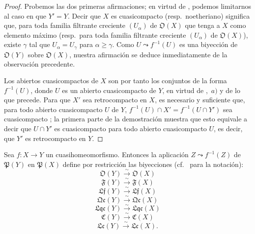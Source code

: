 \begin{proof}
Probemos las dos primeras afirmaciones; en virtud de , podemos limitarnos al caso en que $Y'=Y$.
Decir que $X$ es cuasicompacto (resp.\ noetheriano) significa que, para toda familia filtrante creciente $(U_\alpha)$ de $\mathfrak{O}(X)$ que tenga a $X$ como elemento máximo (resp.\ para toda familia filtrante creciente $(U_\alpha)$ de $\mathfrak{O}(X)$), existe $\gamma$ tal que $U_\alpha=U_\gamma$ para $\alpha\geq\gamma$.
Como $U\leadsto f^{-1}(U)$ es una biyección de $\mathfrak{O}(Y)$ sobre $\mathfrak{O}(X)$, nuestra afirmación se deduce inmediatamente de la observación precedente.

Los abiertos cuasicompactos de $X$ son por tanto los conjuntos de la forma $f^{-1}(U)$, donde $U$ es un abierto cuasicompacto de $Y$, en virtud de ,~$a)$ y de lo que precede.
Para que $X'$ sea retrocompacto en $X$, es necesario y suficiente que, para todo abierto cuasicompacto $U$ de $Y$, $f^{-1}(U)\cap X'=f^{-1}(U\cap Y')$ sea cuasicompacto ; la primera parte de la demostración muestra que esto equivale a decir que $U\cap Y'$ es cuasicompacto para todo abierto cuasicompacto $U$, es decir, que $Y'$ es retrocompacto en $Y$.
\end{proof}

\begin{proposition}[10.2.7]
\label{IV.10.2.7}
Sea $f:X\to Y$ un cuasihomeomorfismo.
Entonces la aplicación $Z\leadsto f^{-1}(Z)$ de $\mathfrak{P}(Y)$ en $\mathfrak{P}(X)$ define por restricción las biyecciones \textup{(cf.\  para la notación)}:
\[
  \mathfrak{O}(Y)\xrightarrow{\sim}\mathfrak{O}(X)
\]
\[
  \mathfrak{F}(Y)\xrightarrow{\sim}\mathfrak{F}(X)
\]
\[
  \mathfrak{Lf}(Y)\xrightarrow{\sim}\mathfrak{Lf}(X)
\]
\[
  \mathfrak{Qc}(Y)\xrightarrow{\sim}\mathfrak{Qc}(X)
\]
\[
  \mathfrak{Lqc}(Y)\xrightarrow{\sim}\mathfrak{Lqc}(X)
\]
\[
  \mathfrak{C}(Y)\xrightarrow{\sim}\mathfrak{C}(X)
\]
\[
  \mathfrak{Lc}(Y)\xrightarrow{\sim}\mathfrak{Lc}(X).
\]
\end{proposition}

